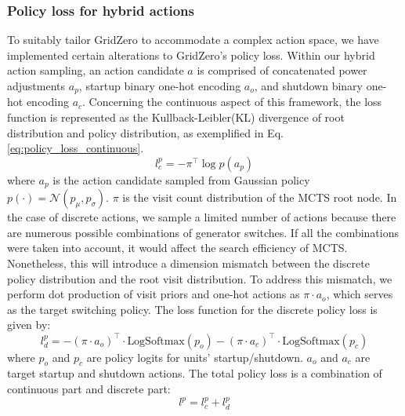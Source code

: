 \subsubsection*{Policy loss for hybrid actions}
To suitably tailor GridZero to accommodate a complex action space, we have implemented certain alterations to GridZero's policy loss. 
Within our hybrid action sampling, an action candidate $a$ is comprised of concatenated power adjustments $a_p$, startup binary one-hot encoding $a_o$, and shutdown binary one-hot encoding $a_c$. Concerning the continuous aspect of this framework, the loss function is represented as the Kullback-Leibler(KL) divergence of root distribution and policy distribution, as exemplified in Eq.\ref{eq:policy_loss_continuous}.
\begin{equation}
\label{eq:policy_loss_continuous}
    l^p_c=-\pi^\top\log p(a_p)
\end{equation}
where $a_p$ is the action candidate sampled from Gaussian policy $p(\cdot)=\mathcal{N}(p_\mu,p_\sigma)$. $\pi$ is the visit count distribution of the MCTS root node. In the case of discrete actions, we sample a limited number of actions because there are numerous possible combinations of generator switches. If all the combinations were taken into account, it would affect the search efficiency of MCTS. Nonetheless, this will introduce a dimension mismatch between the discrete policy distribution and the root visit distribution. To address this mismatch, we perform dot production of visit priors and one-hot actions as $\pi\cdot a_o$, which serves as the target switching policy. The loss function for the discrete policy loss is given by:
\begin{equation}
    l^p_d=-(\pi\cdot a_o)^\top \cdot\text{LogSoftmax}(p_o)-(\pi\cdot a_c)^\top\cdot\text{LogSoftmax}(p_c)
\end{equation}
where $p_o$ and $p_c$ are policy logits for units' startup/shutdown. $a_o$ and $a_c$ are target startup and shutdown actions. The total policy loss is a combination of continuous part and discrete part:
\begin{equation}
    l^p=l_c^p+l_d^p
\end{equation}

